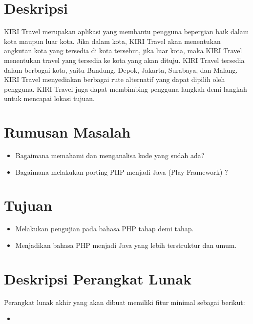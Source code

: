 \documentclass[a4paper,twoside]{article}
\begin{document}
\title{\@judultopik}
\author{\nama \textendash \@npm} 

\newcommand{\nama}{Steven Sutana}
\newcommand{\@npm}{2012730046}
\newcommand{\@judultopik}{Porting PHP menjadi Play Framework (KIRI \textit{Front-End})} %
\newcommand{\jumpemb}{1} %
\newcommand{\tanggal}{26/08/2015}
\maketitle


\section{Deskripsi}
KIRI Travel merupakan aplikasi yang membantu pengguna bepergian baik dalam kota maupun luar kota. Jika dalam kota, KIRI Travel akan menentukan angkutan kota yang tersedia di kota tersebut, jika luar kota, maka KIRI Travel menentukan travel yang tersedia ke kota yang akan dituju. KIRI Travel tersedia dalam berbagai kota, yaitu Bandung, Depok, Jakarta, Surabaya, dan Malang. KIRI Travel menyediakan berbagai rute alternatif yang dapat dipilih oleh pengguna. KIRI Travel juga dapat membimbing pengguna langkah demi langkah untuk mencapai lokasi tujuan. 


\section{Rumusan Masalah}
\begin{itemize}
	\item Bagaimana memahami dan menganalisa kode yang sudah ada?
	\item Bagaimana melakukan porting PHP menjadi Java (Play Framework) ?
\end{itemize}

\section{Tujuan}
\begin{itemize}
	\item Melakukan pengujian pada bahasa PHP tahap demi tahap.
	\item Menjadikan bahasa PHP menjadi Java yang lebih terstruktur dan umum.
\end{itemize}

\section{Deskripsi Perangkat Lunak}
Perangkat lunak akhir yang akan dibuat memiliki fitur minimal sebagai berikut:
\begin{itemize}
	\item 
\end{itemize}
\end{document}
